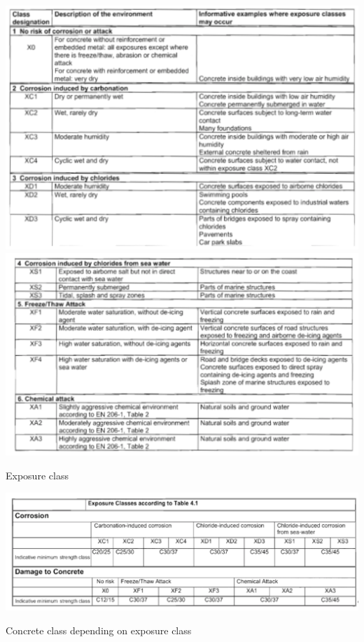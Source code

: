 \documentclass[landscape]{article}
\begin{document}
\begin{multicols*}{2}
\begin{table}[H]
    \centering
    \includegraphics[width=0.95\linewidth]{img/expo_class}\\
    \includegraphics[width=0.95\linewidth]{img/4_1.png}
    \caption{Exposure class}
    \label{tab:expo_class}
\end{table}

\begin{table}[H]
    \centering
    \includegraphics[width=0.95\linewidth]{img/min_class.png}
    \caption{Concrete class depending on exposure class}
    \label{tab:concrete_class}
\end{table}


\end{multicols*}
\end{document}
